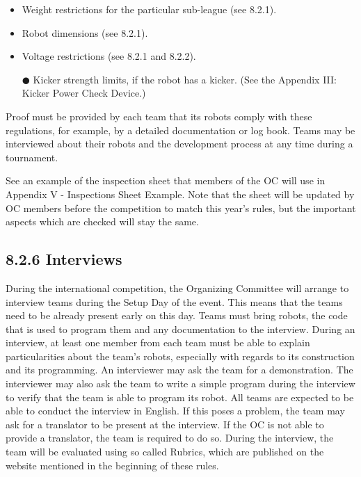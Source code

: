 \documentclass{article}
\begin{document}
\begin{itemize}
\item Weight restrictions for the particular sub-league (see 8.2.1). 

\item Robot dimensions (see 8.2.1). 

\item Voltage restrictions (see 8.2.1 and 8.2.2). 

${\CIRCLE}$ Kicker strength limits, if the robot has a kicker. (See the Appendix \textcolor{color-5}{III}: Kicker Power Check Device.)

\end{itemize}
Proof must be provided by each team that its robots comply with these regulations, for example, by a detailed documentation or log book. Teams may be interviewed about their robots and the development process at any time during a tournament.

\textcolor{color-5}{See an example of the inspection sheet that members of the OC will use in Appendix V - Inspections Sheet Example. Note that the sheet will be updated by OC members before the competition to match this year's rules, but the important aspects which are checked will stay the same.}

\subsection{8.2.6 Interviews \label{ref-060}}

\textcolor{color-5}{During the international competition, the Organizing Committee will arrange to interview teams during the Setup Day of the event. This means that the teams need to be already present early on this day. Teams must bring robots, the code that is used to program them and any documentation to the interview. During an interview, at least one member from each team must be able to explain particularities about the team's robots, especially with regards to its construction and its programming. An interviewer may ask the team for a demonstration. The interviewer may also ask the team to write a simple program during the interview to verify that the team is able to program its robot. All teams are expected to be able to conduct the interview in English. If this poses a problem, the team may ask for a translator to be present at the interview. If the OC is not able to provide a translator, the team is required to do so. During the interview, the team will be evaluated using so called Rubrics, which are published on the website mentioned in the beginning of these rules.}
\end{document}
